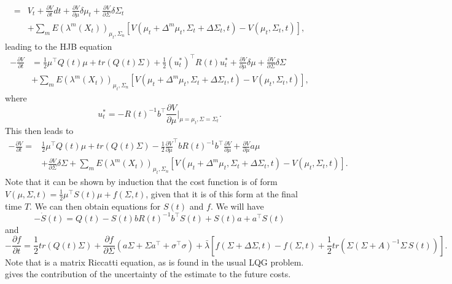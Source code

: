 \begin{eqnarray*}
 =&V_t + \frac{\partial V}{\partial t}dt + \frac{\partial V}{\partial \mu} \delta\mu_t +\frac{\partial V}{\partial \Sigma} \delta \Sigma_t\\ &+ \sum_m E(\lambda^m(X_t))_{\mu_t,\Sigma_n} \left[V\left(\mu_t +\Delta^m\mu_t , \Sigma_t+\Delta\Sigma_t,t\right)-V(\mu_t,\Sigma_t,t)\right],
\end{eqnarray*}
leading to the HJB equation
\begin{eqnarray}
-\frac{\partial V}{\partial t} &=\frac{1}{2}\mu^\top Q(t)\mu + tr\left(Q(t) \Sigma\right) +\frac{1}{2} (u_t^*)^\top R(t) u_t^*  + \frac{\partial V}{\partial \mu} \delta\mu +\frac{\partial V}{\partial \Sigma} \delta \Sigma \\
&+\sum_m E(\lambda^m(X_t))_{\mu_t,\Sigma_n} \left[V\left(\mu_t +\Delta^m\mu_t , \Sigma_t+\Delta\Sigma_t,t\right)-V(\mu_t,\Sigma_t,t)\right]\nonumber,
\end{eqnarray}
where
\[
u_t^* = -R(t)^{-1} b^\top \frac{\partial V}{\partial \mu}\bigg|_{\mu=\mu_t,\Sigma=\Sigma_t}.
\]
This then leads to
\begin{eqnarray}
-\frac{\partial V}{\partial t} =&\frac{1}{2}\mu^\top Q(t)\mu + tr\left(Q(t) \Sigma\right) -\frac{1}{2} \frac{\partial V}{\partial \mu}^\top b R(t)^{-1} b^\top \frac{\partial V}{\partial \mu}  + \frac{\partial V}{\partial \mu} a \mu  \\
&+\frac{\partial V}{\partial \Sigma} \delta \Sigma+\sum_m E(\lambda^m(X_t))_{\mu_t,\Sigma_n} \left[V\left(\mu_t +\Delta^m\mu_t , \Sigma_t+\Delta\Sigma_t,t\right)-V(\mu_t,\Sigma_t,t)\right]\nonumber.
\end{eqnarray}
Note that it can be shown by induction that the cost function is of form $V(\mu,\Sigma,t) =\frac{1}{2} \mu^\top S(t) \mu + f(\Sigma,t)$, given that it is of this form at the final time $T$. We can then obtain equations for $S(t)$ and $f$. We will have
\begin{equation}
\label{eq:riccatti}
-\dot{S}(t) = Q(t) - S(t) b R(t)^{-1} b^\top S(t) + S(t) a + a^\top S(t)
\end{equation}
and
\begin{equation}
-\frac{\partial f}{\partial t} = \frac{1}{2} tr\left(Q(t) \Sigma\right) + \frac{\partial f}{\partial \Sigma} \left(a\Sigma + \Sigma a^\top + \sigma^\top\sigma\right) + \bar{\lambda} \left[f(\Sigma+\Delta\Sigma,t) - f(\Sigma,t) +\frac{1}{2} tr\left(\Sigma (\Sigma+A)^{-1}\Sigma\, S(t)\right)\right].
\label{eq:f_variance}
\end{equation}
Note that  is a matrix Riccatti equation, as is found in the usual LQG problem.  gives the contribution of the uncertainty of the estimate to the future costs.
